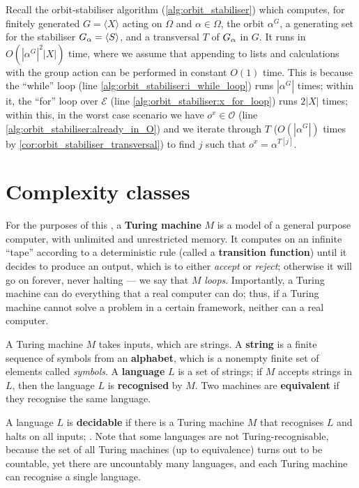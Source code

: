 \begin{example}\label{eg:alg:orbit_stabiliser:complexity}
  Recall the orbit-stabiliser algorithm (\autoref{alg:orbit_stabiliser}) which computes, for finitely generated $G = \langle X \rangle$ acting on $\Omega$ and $\alpha \in \Omega$, the orbit $\alpha^G$, a generating set for the stabiliser $\added{2}{G_\alpha} = \langle S \rangle$, and a transversal $T$ of $\added{2}{G_\alpha}$ in $G$. It runs in $O(|\alpha^G|^2|X|)$ time, where we assume that appending to lists and calculations with the group action can be performed in constant $O(1)$ time. This is because the ``while'' loop (line \ref{alg:orbit_stabiliser:i_while_loop}) runs $|\alpha^G|$ times; within it, the ``for'' loop over $\mathcal{E}$ (line \ref{alg:orbit_stabiliser:x_for_loop}) runs $2|X|$ times; within this, in the worst case scenario we have $o^x \in \mathcal{O}$ (line \ref{alg:orbit_stabiliser:already_in_O}) and we iterate through $T$ ($O(|\alpha^G|)$ times by \autoref{cor:orbit_stabiliser_transversal}) to find $j$ such that $o^x = \alpha^{T[j]}$.
\end{example}

\section{Complexity classes}

For the purposes of this \thesis, a \textbf{Turing machine} $M$ is a model of a general purpose computer, with unlimited and unrestricted memory. It computes on an infinite ``tape'' according to a deterministic rule (called a \textbf{transition function}) until it decides to produce an output, which is to either \textit{accept} or \textit{reject}; otherwise it will go on forever, never halting --- we say that $M$ \textit{loops}. Importantly, a Turing machine can do everything that a real computer can do; thus, if a Turing machine cannot solve a problem in a certain framework, neither can a real computer.

A Turing machine $M$ takes inputs, which are strings. A \textbf{string} is a finite sequence of symbols from an \textbf{alphabet}, which is a nonempty finite set of elements called \textit{symbols}. A \textbf{language} $L$ is a set of strings; if $M$ accepts strings in $L$, then the language $L$ is \textbf{recognised} by $M$. Two machines are \textbf{equivalent} if they recognise the same language.

A language $L$ is \textbf{decidable} if there is a Turing machine $M$ that recognises $L$ and halts on all inputs; . Note that some languages are not Turing-recognisable, because the set of all Turing machines (up to equivalence) turns out to be countable, yet there are uncountably many languages, and each Turing machine can recognise a single language. 

